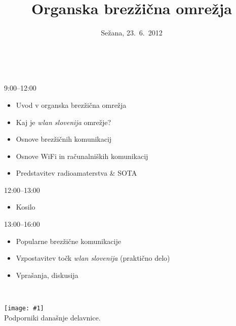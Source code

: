 \documentclass[]{beamer}
\title{Organska brezžična omrežja}
\subtitle{Sežana, 23.~6.~2012}
\date[]{}
\newcommand{\wlanslovenija}{\emph{wlan slovenija }}
\newcommand{\ifstrempty}[3]{%
\def\reallyempty{}%
\def\ifarg{#1}%
\ifx\ifarg\reallyempty%
{#2}
\else
{#3}
\fi%
}
\newcommand{\wrapframe}[1]{
\begin{frame}
 #1
\end{frame}
}
\newcommand{\simpleslide}[3]{\wrapframe{
\ifstrempty{#1}{\vbox{ \ } 

}{
{\footnotesize #1}
} \vfill

\begin{center}
#2
\end{center}
\vfill
\ifstrempty{#3}{ \ }{
\begin{flushright}
{\footnotesize #3}
\end{flushright}
}
}}
\newcommand{\simpleslideimage}[2]{\wrapframe{
\begin{center}
\texttt{[image: \#1]}
\\ {\footnotesize #2}
\end{center}}
}
\begin{document}
\maketitle

\simpleslide{}{\vspace{-2em}
9:00--12:00
   \begin{itemize}
   \item Uvod v organska brezžična omrežja
   \item Kaj je \wlanslovenija omrežje?
   \item Osnove brezžičnih komunikacij
   \item Osnove WiFi in računalniških komunikacij
   \item Predstavitev radioamaterstva \& SOTA
   \end{itemize}
12:00--13:00
   \begin{itemize}
   \item Kosilo
   \end{itemize}
13:00--16:00
   \begin{itemize}
   \item Popularne brezžične komunikacije
   \item Vzpostavitev točk \wlanslovenija (praktično delo)
   \item Vprašanja, diskusija
   \end{itemize}
}{}

\simpleslideimage{supporters/sezana.png}{Podporniki današnje delavnice.}
\end{document}
